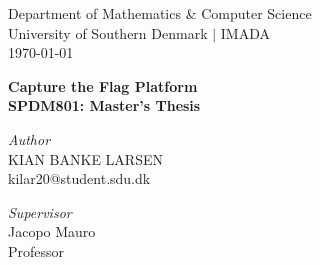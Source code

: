 

\usepackage[block=ragged, sorting=nyt, style=authoryear-ibid, backend=biber]{biblatex}
\setlength{}



\begin{titlepage}
    \begin{centering}
    \vspace*{-20px}\large Department of Mathematics \& Computer Science\\
    University of Southern Denmark $|$ IMADA \\
    \today \\
    
    \vspace{\fill}
    
    \huge{\bf  Capture the Flag Platform} \\
    \Large{\bf SPDM801: Master's Thesis}
    
    \vspace{\fill}
    
    \begin{minipage}{0.45\textwidth} 
    \begin{flushleft}
        \Large
        \textit{Author}\\
        KIAN BANKE LARSEN\\
        kilar20@student.sdu.dk
    \end{flushleft}
    \end{minipage}
    
    \vspace{\fill}
    
    \begin{minipage}{0.45\textwidth}
    \begin{flushleft}
        \Large
        \textit{Supervisor}\\
        Jacopo Mauro\\
        Professor
    \end{flushleft}
    \end{minipage}
    
    \vspace{\fill}
    
    
    
    \vspace*{0.1cm}
    
    \end{centering}
    
    \thispagestyle{empty}
\end{titlepage}

